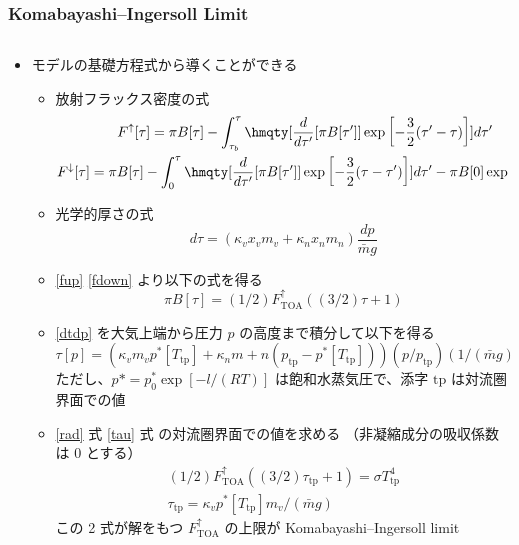 \documentclass[aspectratio=149,9pt]{beamer}
\newcommand{\hmTOA}{\mathrm{TOA}}
\newcommand{\hmtp}{\mathrm{tp}}
\renewcommand{\qty}{\hmqty}
\begin{document}
\begin{frame}
	\frametitle{Komabayashi--Ingersoll Limit}
	\footnotesize
	\begin{columns}
		\begin{column}{.8\textwidth}
			\begin{itemize}
				\item モデルの基礎方程式から導くことができる
					\begin{itemize}\scriptsize
						\item 放射フラックス密度の式
							\begin{gather}
								F^\uparrow[\tau]=
								\pi B[\tau]-\int^\tau_{\tau_b}\qty[\dv{}{\tau'}[\pi B[\tau']]
								\exp\left[-\frac{3}{2}(\tau'-\tau)\right]]d\tau'\label{fup}
								\\
								F^\downarrow[\tau]=
								\pi B[\tau]-\int^\tau_0\qty[\dv{}{\tau'}[\pi B[\tau']]
								\exp\left[-\frac{3}{2}(\tau-\tau')\right]]d\tau'
								-\pi B[0]\exp\left[-\frac{3}{2}\tau\right]\label{fdown}
							\end{gather}
						\item 光学的厚さの式
							\begin{equation}
								d\tau=(\kappa_vx_vm_v+\kappa_nx_nm_n)\frac{dp}{\bar mg}\label{dtdp}
							\end{equation}
						\item \eqref{fup} \eqref{fdown} より以下の式を得る
							\begin{equation}
								\pi B[\tau]=(1/2)F^\uparrow_\hmTOA((3/2)\tau+1)
								\label{rad}
							\end{equation}
						\item \eqref{dtdp} を大気上端から圧力 \(p\) の高度まで積分して以下を得る
							\begin{equation}
								\tau[p]=(\kappa_vm_vp^*[T_\hmtp]+\kappa_nm+n(p_\hmtp-p^*[T_\hmtp]))
								(p/p_\hmtp)(1/(\bar mg))\label{tau}
							\end{equation}
							ただし、\(p*=p^*_0\exp[-l/(RT)]\) は飽和水蒸気圧で、添字 \(\hmtp\) は対流圏界面での値
						\item \eqref{rad} 式 \eqref{tau} 式 の対流圏界面での値を求める
							（非凝縮成分の吸収係数は \(0\) とする）
							\begin{gather}
								(1/2)F^\uparrow_\hmTOA((3/2)\tau_\hmtp+1)=\sigma T^4_\hmtp\label{radtp}\\
								\tau_\hmtp=\kappa_vp^*[T_\hmtp]m_v/(\bar mg)\label{tautp}
							\end{gather}
							この 2 式が解をもつ \(F^\uparrow_\hmTOA\) の上限が Komabayashi--Ingersoll limit

\end{itemize}
\end{itemize}
\end{column}
\end{columns}
\end{frame}
\end{document}

